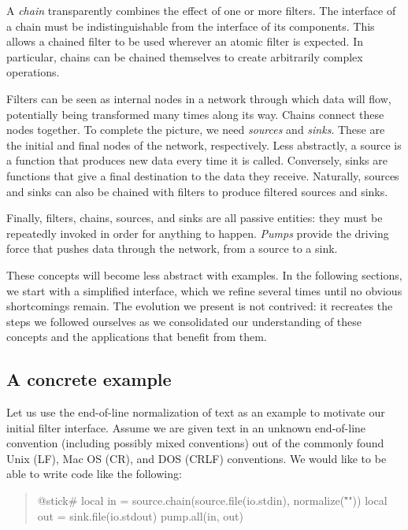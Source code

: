 \documentclass[10pt]{article}
\begin{document}
A \emph{chain} transparently combines the effect of one or
more filters. The interface of a chain must be
indistinguishable from the interface of its components.
This  allows a chained filter to be used wherever an atomic
filter is expected. In particular, chains can be chained
themselves to create arbitrarily complex operations.

Filters can be seen as internal nodes in a network through
which data will flow, potentially being transformed many
times along its way.  Chains connect these nodes together.
To complete the picture, we need \emph{sources} and
\emph{sinks}. These are the initial and final nodes of the
network, respectively.  Less abstractly, a source is a
function that produces new data every time it is called.
Conversely, sinks are functions that give a final
destination to the data they receive.  Naturally, sources
and sinks can also be chained with filters to produce
filtered sources and sinks.

Finally, filters, chains, sources, and sinks are all passive
entities: they must be repeatedly invoked in order for
anything to happen.  \emph{Pumps} provide the driving force
that pushes data through the network, from a source to a
sink.

These concepts will become less abstract with examples.  In
the following sections, we start with a simplified
interface, which we refine several times until no obvious
shortcomings remain. The evolution we present is not
contrived: it recreates the steps we followed ourselves as
we consolidated our understanding of these concepts and the
applications that benefit from them. 

\subsection{A concrete example}

Let us use the end-of-line normalization of text as an
example to motivate our initial filter interface. 
Assume we are given text in an unknown end-of-line
convention (including possibly mixed conventions) out of the
commonly found Unix (LF), Mac OS (CR), and DOS (CRLF)
conventions. We would like to be able to write code like the
following:
\begin{quote}
\begin{lua}
@stick#
local in = source.chain(source.file(io.stdin), normalize("\r\n"))
local out = sink.file(io.stdout)
pump.all(in, out)
%
\end{lua}
\end{quote}
\end{document}
